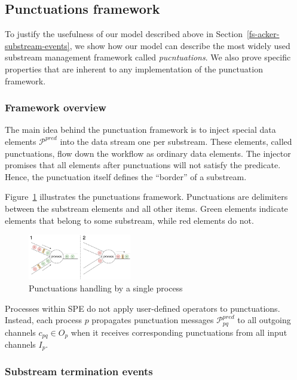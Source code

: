\subsection{Punctuations framework}
\label{fs-acker-punctuations}

To justify the usefulness of our model described above in Section~\ref{fs-acker-substream-events}, we show how our model can describe the most widely used substream management framework called {\em pucntuations}. We also prove specific properties that are inherent to any implementation of the punctuation framework. 

\subsubsection{Framework overview}

The main idea behind the punctuation framework is to inject special data elements $\mathcal{P}^{pred}$ into the data stream one per substream. These elements, called punctuations, flow down the workflow as ordinary data elements. The injector promises that all elements after punctuations will not satisfy the predicate. Hence, the punctuation itself defines the ``border'' of a substream.

Figure~\ref{punctuations_scheme} illustrates the punctuations framework. Punctuations are delimiters between the substream elements and all other items. Green elements indicate elements that belong to some substream, while red elements do not.

\begin{figure}[t]
  \centering
  \includegraphics[width=0.40\textwidth]{pics/punctuations-scheme.pdf}
  \caption{Punctuations handling by a single process}
  \label{punctuations_scheme}
\end{figure}

Processes within SPE do not apply user-defined operators to punctuations. Instead, each process $p$ propagates punctuation messages $\mathcal{P}_{pq}^{pred}$ to all outgoing channels $c_{pq} \in O_p$  when it receives corresponding punctuations from all input channels $I_p$.

\subsubsection{Substream termination events}

